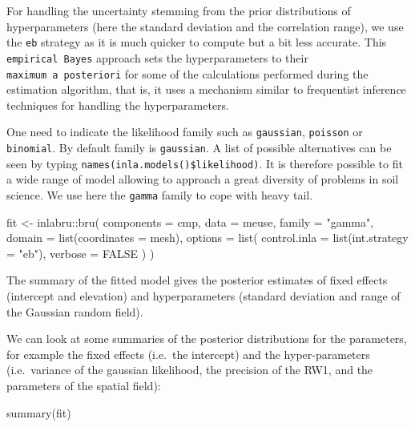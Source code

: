 \documentclass[
  a4paper,
]{article}
\newenvironment{Shaded}{\begin{snugshade}}{\end{snugshade}}
\newcommand{\AttributeTok}[1]{\textcolor[rgb]{0.40,0.45,0.13}{#1}}
\newcommand{\ConstantTok}[1]{\textcolor[rgb]{0.56,0.35,0.01}{#1}}
\newcommand{\FunctionTok}[1]{\textcolor[rgb]{0.28,0.35,0.67}{#1}}
\newcommand{\NormalTok}[1]{\textcolor[rgb]{0.00,0.23,0.31}{#1}}
\newcommand{\OtherTok}[1]{\textcolor[rgb]{0.00,0.23,0.31}{#1}}
\newcommand{\SpecialCharTok}[1]{\textcolor[rgb]{0.37,0.37,0.37}{#1}}
\newcommand{\StringTok}[1]{\textcolor[rgb]{0.13,0.47,0.30}{#1}}
\begin{document}
For handling the uncertainty stemming from the prior distributions of
hyperparameters (here the standard deviation and the correlation range),
we use the \texttt{eb} strategy as it is much quicker to compute but a
bit less accurate. This \texttt{empirical\ Bayes} approach sets the
hyperparameters to their \texttt{maximum\ a\ posteriori} for some of the
calculations performed during the estimation algorithm, that is, it uses
a mechanism similar to frequentist inference techniques for handling the
hyperparameters.

One need to indicate the likelihood family such as \texttt{gaussian},
\texttt{poisson} or \texttt{binomial}. By default family is
\texttt{gaussian}. A list of possible alternatives can be seen by typing
\texttt{names(inla.models()\$likelihood)}. It is therefore possible to
fit a wide range of model allowing to approach a great diversity of
problems in soil science. We use here the \texttt{gamma} family to cope
with heavy tail.

\begin{Shaded}
\begin{Highlighting}[]
\NormalTok{fit }\OtherTok{\textless{}{-}}\NormalTok{ inlabru}\SpecialCharTok{::}\FunctionTok{bru}\NormalTok{(}
  \AttributeTok{components =}\NormalTok{ cmp,}
  \AttributeTok{data =}\NormalTok{ meuse,}
  \AttributeTok{family =} \StringTok{"gamma"}\NormalTok{,}
  \AttributeTok{domain =} \FunctionTok{list}\NormalTok{(}\AttributeTok{coordinates =}\NormalTok{ mesh),}
  \AttributeTok{options =} \FunctionTok{list}\NormalTok{(}
    \AttributeTok{control.inla =} \FunctionTok{list}\NormalTok{(}\AttributeTok{int.strategy =} \StringTok{"eb"}\NormalTok{),}
    \AttributeTok{verbose =} \ConstantTok{FALSE}
\NormalTok{  )}
\NormalTok{)}
\end{Highlighting}
\end{Shaded}

The summary of the fitted model gives the posterior estimates of fixed
effects (intercept and elevation) and hyperparameters (standard
deviation and range of the Gaussian random field).

We can look at some summaries of the posterior distributions for the
parameters, for example the fixed effects (i.e.~the intercept) and the
hyper-parameters (i.e.~variance of the gaussian likelihood, the
precision of the RW1, and the parameters of the spatial field):

\begin{Shaded}
\begin{Highlighting}[]
\FunctionTok{summary}\NormalTok{(fit)}
\end{Highlighting}
\end{Shaded}
\end{document}
